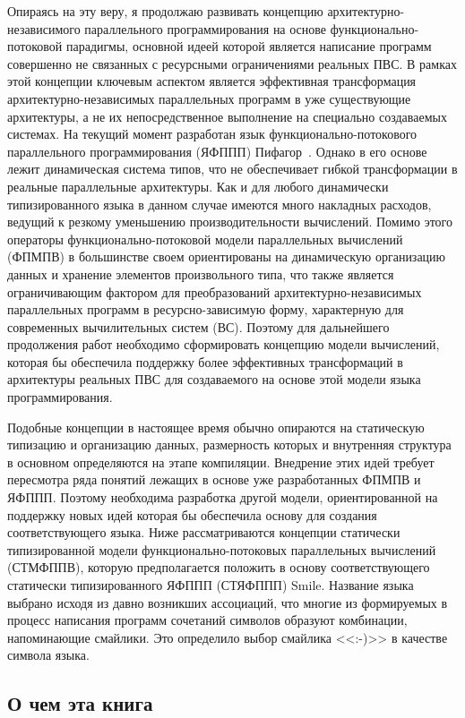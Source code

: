 Опираясь на эту веру, я продолжаю развивать концепцию архитектурно-независимого параллельного программирования на основе функционально-потоковой парадигмы, основной идеей которой является написание программ совершенно не связанных с ресурсными ограничениями реальных ПВС. В рамках этой концепции ключевым аспектом является эффективная трансформация архитектурно-независимых параллельных программ в уже существующие архитектуры, а не их непосредственное выполнение на специально создаваемых системах. На текущий момент разработан язык функционально-потокового параллельного программирования (ЯФППП) Пифагор~\cite{legalov-vt-2005}. Однако в его основе лежит динамическая система типов, что не обеспечивает гибкой трансформации в реальные параллельные архитектуры. Как и для любого динамически типизированного языка в данном случае имеются много накладных расходов, ведущий к резкому уменьшению производительности вычислений. Помимо этого операторы функционально-потоковой модели параллельных вычислений (ФПМПВ) в большинстве своем ориентированы на динамическую организацию данных и хранение элементов произвольного типа, что также является ограничивающим фактором для преобразований архитектурно-независимых параллельных программ в ресурсно-зависимую форму, характерную для современных вычилительных систем (ВС). Поэтому для дальнейшего продолжения работ необходимо сформировать концепцию модели вычислений, которая бы обеспечила поддержку более эффективных трансформаций в архитектуры реальных ПВС для создаваемого на основе этой модели языка программирования.

Подобные концепции в настоящее время обычно опираются на статическую типизацию и организацию данных, размерность которых и внутренняя структура в основном определяются на этапе компиляции. Внедрение этих идей требует пересмотра ряда понятий лежащих в основе уже разработанных ФПМПВ и ЯФППП. Поэтому необходима разработка другой модели, ориентированной на поддержку новых идей которая бы обеспечила основу для создания соответствующего языка. Ниже рассматриваются концепции статически типизированной модели функционально-потоковых параллельных вычислений (СТМФППВ), которую предполагается положить в основу соответствующего статически типизированного ЯФППП (СТЯФППП) Smile. Название языка выбрано исходя из давно возникших ассоциаций, что многие из формируемых в процесс написания программ сочетаний символов образуют комбинации, напоминающие смайлики. Это определило выбор смайлика <<:-)>> в качестве символа языка.

\subsection*{О чем эта книга}

